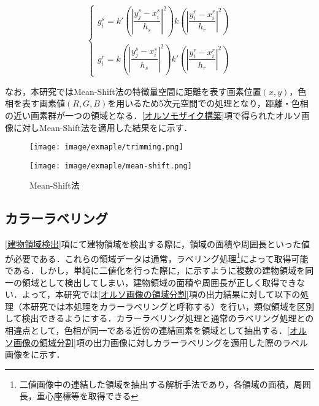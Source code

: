       \begin{equation}
        \label{Mean-Shift法3}
        \left\{
          \begin{array}{l}
            g_{i}^s = k' (|\dfrac{y_{j}^s - x_{i}^s} {h_{s}}|^2)
              k  (|\dfrac{y_{i}^r - x_{i}^r} {h_{r}}|^2) \\ \\
            g_{i}^r = k  (|\dfrac{y_{j}^s - x_{i}^s} {h_{s}}|^2) 
              k' (|\dfrac{y_{i}^r - x_{i}^r} {h_{r}}|^2)
          \end{array}
        \right.
      \end{equation}

      なお，本研究ではMean-Shift法の特徴量空間に距離を表す画素位置$(x,y)$，色相を表す画素値$(R,G,B)$を用いるため5次元空間での処理となり，距離・色相の近い画素群が一つの領域となる．\ref{オルソモザイク構築}項で得られたオルソ画像に対しMean-Shift法を適用した結果をに示す．

      \begin{figure}[tbp]
        \begin{minipage}[c]{0.5\hsize}
          \centering
          \texttt{[image: image/exmaple/trimming.png]}
        \end{minipage}
        \begin{minipage}[c]{0.45\hsize}
          \centering
          \texttt{[image: image/exmaple/mean-shift.png]}
        \end{minipage}
        \caption{Mean-Shift法}
        \label{Mean-Shift法}
      \end{figure}


    \subsection{カラーラベリング}
      \label{カラーラベリング}
      \ref{建物領域検出}項にて建物領域を検出する際に，領域の面積や周囲長といった値が必要である．これらの領域データは通常，ラベリング処理\footnote{二値画像中の連結した領域を抽出する解析手法であり，各領域の面積，周囲長，重心座標等を取得できる}によって取得可能である．しかし，単純に二値化を行った際に，に示すように複数の建物領域を同一の領域として検出してしまい，建物領域の面積や周囲長が正しく取得できない．よって，本研究では\ref{オルソ画像の領域分割}項の出力結果に対して以下の処理（本研究では本処理をカラーラベリングと呼称する）を行い，類似領域を区別して検出できるようにする．カラーラベリング処理と通常のラベリング処理との相違点として，色相が同一である近傍の連結画素を領域として抽出する．\ref{オルソ画像の領域分割}項の出力画像に対しカラーラベリングを適用した際のラベル画像をに示す．

